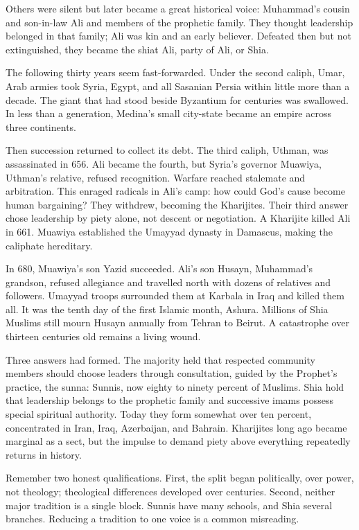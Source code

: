 Others were silent but later became a great historical voice: Muhammad's cousin and son-in-law Ali and members of the prophetic family. They thought leadership belonged in that family; Ali was kin and an early believer. Defeated then but not extinguished, they became the shiat Ali, party of Ali, or Shia.

The following thirty years seem fast-forwarded. Under the second caliph, Umar, Arab armies took Syria, Egypt, and all Sasanian Persia within little more than a decade. The giant that had stood beside Byzantium for centuries was swallowed. In less than a generation, Medina's small city-state became an empire across three continents.

Then succession returned to collect its debt. The third caliph, Uthman, was assassinated in 656. Ali became the fourth, but Syria's governor Muawiya, Uthman's relative, refused recognition. Warfare reached stalemate and arbitration. This enraged radicals in Ali's camp: how could God's cause become human bargaining? They withdrew, becoming the Kharijites. Their third answer chose leadership by piety alone, not descent or negotiation. A Kharijite killed Ali in 661. Muawiya established the Umayyad dynasty in Damascus, making the caliphate hereditary.

In 680, Muawiya's son Yazid succeeded. Ali's son Husayn, Muhammad's grandson, refused allegiance and travelled north with dozens of relatives and followers. Umayyad troops surrounded them at Karbala in Iraq and killed them all. It was the tenth day of the first Islamic month, Ashura. Millions of Shia Muslims still mourn Husayn annually from Tehran to Beirut. A catastrophe over thirteen centuries old remains a living wound.

Three answers had formed. The majority held that respected community members should choose leaders through consultation, guided by the Prophet's practice, the sunna: Sunnis, now eighty to ninety percent of Muslims. Shia hold that leadership belongs to the prophetic family and successive imams possess special spiritual authority. Today they form somewhat over ten percent, concentrated in Iran, Iraq, Azerbaijan, and Bahrain. Kharijites long ago became marginal as a sect, but the impulse to demand piety above everything repeatedly returns in history.

Remember two honest qualifications. First, the split began politically, over power, not theology; theological differences developed over centuries. Second, neither major tradition is a single block. Sunnis have many schools, and Shia several branches. Reducing a tradition to one voice is a common misreading.

